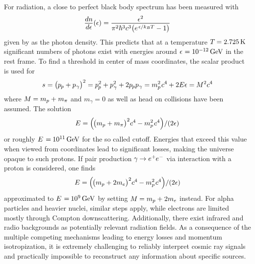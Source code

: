 For  radiation, a close to perfect black body spectrum has been measured with
\begin{equation*}
	\frac{\raisebox{-0.3ex}{$dn$}}{\raisebox{0.15ex}{$d\epsilon$}} (\epsilon) \kern+0.2pt =
	\frac{\raisebox{-0.3ex}{$\epsilon^2$}}{\pi^2 \hbar^3 c^3 \bigl( e^{\kern+1.0pt \epsilon / k_B T} - 1 \bigr)}
\end{equation*}
given by \cite{Gaisser_2016} as the photon density. This predicts that at a temperature $T \kern-0.5pt = \qty{2.725}{\kelvin}$
significant numbers of photons exist with energies around $\epsilon \kern+0.5pt = \qty{e-12}{\giga\electronvolt}$
in the  rest frame. To find a threshold in center of mass coordinates, the scalar product is used for
\begin{equation*}
	s \kern+0.3pt = \bigl( p_{\kern-0.5pt p} + p_{\kern+0.5pt \gamma} \bigr)^2 =
	p_{\kern-0.5pt p}^2 + p_{\kern+0.5pt \gamma}^2 + 2 p_{\kern-0.5pt p} p_{\kern+0.5pt \gamma} =
	m_p^2 \kern+0.8pt c^4 \kern-0.2pt + 2 E \epsilon = \kern-0.2pt M^2c^4
\end{equation*}
where $M \kern-0.3pt = m_p + \kern+0.3pt m_\pi$ and $m_\gamma = 0$ as well as head on collisions have been assumed. The solution
\begin{equation*}
	E = \Bigl( \kern-1.0pt \bigl( m_p + m_\pi \bigr)^2 c^4 \kern-0.2pt - m_p^2 \kern+0.8pt c^4 \Bigr) / (2\epsilon)
\end{equation*}
or roughly $E \kern+1.0pt = \kern-0.5pt \qty{e+11}{\giga\electronvolt}$ for the so called  cutoff. Energies that exceed
this value when viewed from  coordinates lead to significant losses, making the universe opaque to such protons.
If pair production $\gamma \kern-0.5pt \rightarrow \smash{e^+ \kern-0.5pt e^-}$ via interaction with a proton is considered,
one finds
\begin{equation*}
	E = \Bigl( \kern-1.0pt \bigl( m_p + 2m_e \bigr)^2 c^4 \kern-0.2pt - m_p^2 \kern+0.8pt c^4 \Bigr) / (2\epsilon)
\end{equation*}
approximated to $E \kern+1.0pt = \kern-0.5pt \qty{e+9}{\giga\electronvolt}$ by setting $M \kern-0.3pt = m_p + \kern+0.3pt 2m_e$
instead. For alpha particles and heavier nuclei, similar steps apply, while electrons are limited mostly through Compton
downscattering. Additionally, there exist infrared and radio backgrounds as potentially relevant radiation fields. As a
consequence of the multiple competing mechanisms leading to energy losses and momentum isotropization, it is extremely challenging
to reliably interpret cosmic ray signals and practically impossible to reconstruct any information about specific sources.



